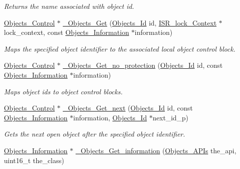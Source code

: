 \begin{DoxyCompactItemize}
\begin{DoxyCompactList}\small\item\em Returns the name associated with object id. \end{DoxyCompactList}\item 
\mbox{\hyperlink{structObjects__Control}{Objects\+\_\+\+Control}} $\ast$ \mbox{\hyperlink{group__RTEMSScoreObject_gaccc5682133e4f65b8cb374eab9be2c9d}{\+\_\+\+Objects\+\_\+\+Get}} (\mbox{\hyperlink{group__RTEMSScoreObject_ga5821f52a51072941bdd603e542d0863e}{Objects\+\_\+\+Id}} id, \mbox{\hyperlink{structISR__lock__Context}{I\+S\+R\+\_\+lock\+\_\+\+Context}} $\ast$lock\+\_\+context, const \mbox{\hyperlink{structObjects__Information}{Objects\+\_\+\+Information}} $\ast$information)
\begin{DoxyCompactList}\small\item\em Maps the specified object identifier to the associated local object control block. \end{DoxyCompactList}\item 
\mbox{\hyperlink{structObjects__Control}{Objects\+\_\+\+Control}} $\ast$ \mbox{\hyperlink{group__RTEMSScoreObject_ga0f21f1287215fd0f82bedfabf5872058}{\+\_\+\+Objects\+\_\+\+Get\+\_\+no\+\_\+protection}} (\mbox{\hyperlink{group__RTEMSScoreObject_ga5821f52a51072941bdd603e542d0863e}{Objects\+\_\+\+Id}} id, const \mbox{\hyperlink{structObjects__Information}{Objects\+\_\+\+Information}} $\ast$information)
\begin{DoxyCompactList}\small\item\em Maps object ids to object control blocks. \end{DoxyCompactList}\item 
\mbox{\hyperlink{structObjects__Control}{Objects\+\_\+\+Control}} $\ast$ \mbox{\hyperlink{group__RTEMSScoreObject_gaf47a19d228137aa86c75bf67953f332e}{\+\_\+\+Objects\+\_\+\+Get\+\_\+next}} (\mbox{\hyperlink{group__RTEMSScoreObject_ga5821f52a51072941bdd603e542d0863e}{Objects\+\_\+\+Id}} id, const \mbox{\hyperlink{structObjects__Information}{Objects\+\_\+\+Information}} $\ast$information, \mbox{\hyperlink{group__RTEMSScoreObject_ga5821f52a51072941bdd603e542d0863e}{Objects\+\_\+\+Id}} $\ast$next\+\_\+id\+\_\+p)
\begin{DoxyCompactList}\small\item\em Gets the next open object after the specified object identifier. \end{DoxyCompactList}\item 
\mbox{\hyperlink{structObjects__Information}{Objects\+\_\+\+Information}} $\ast$ \mbox{\hyperlink{group__RTEMSScoreObject_gaf45a5862e6e8eab0823ef39dfd1e9403}{\+\_\+\+Objects\+\_\+\+Get\+\_\+information}} (\mbox{\hyperlink{group__RTEMSScoreObject_ga2d2636c8d2f1564f3e5b2b14e761574b}{Objects\+\_\+\+A\+P\+Is}} the\+\_\+api, uint16\+\_\+t the\+\_\+class)

\end{DoxyCompactItemize}
